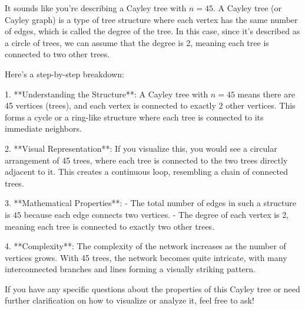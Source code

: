 It sounds like you're describing a Cayley tree with \( n = 45 \). A Cayley tree (or Cayley graph) is a type of tree structure where each vertex has the same number of edges, which is called the degree of the tree. In this case, since it's described as a circle of trees, we can assume that the degree is 2, meaning each tree is connected to two other trees.

Here’s a step-by-step breakdown:

1. **Understanding the Structure**: A Cayley tree with \( n = 45 \) means there are 45 vertices (trees), and each vertex is connected to exactly 2 other vertices. This forms a cycle or a ring-like structure where each tree is connected to its immediate neighbors.

2. **Visual Representation**: If you visualize this, you would see a circular arrangement of 45 trees, where each tree is connected to the two trees directly adjacent to it. This creates a continuous loop, resembling a chain of connected trees.

3. **Mathematical Properties**:
   - The total number of edges in such a structure is \( 45 \) because each edge connects two vertices.
   - The degree of each vertex is 2, meaning each tree is connected to exactly two other trees.

4. **Complexity**: The complexity of the network increases as the number of vertices grows. With 45 trees, the network becomes quite intricate, with many interconnected branches and lines forming a visually striking pattern.

If you have any specific questions about the properties of this Cayley tree or need further clarification on how to visualize or analyze it, feel free to ask!